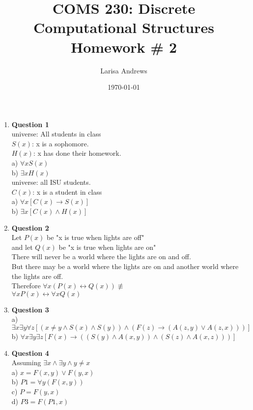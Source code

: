 \documentclass[12pt]{article}
\let\biconditional\leftrightarrow
\begin{document}

\title{
\textbf{COMS 230: Discrete Computational Structures}\\
Homework \# 2 \\}
\author{Larisa Andrews}
\date{\today}
\maketitle

\begin{enumerate}

\item {\bf Question 1} \\
	universe: All students in class \\
	$S(x)$: x is a sophomore. \\
	$H(x)$: x has done their homework. \\
	a) $\forall xS(x)$ \\
	b) $\exists xH(x)$ \\
	universe: all ISU students. \\ 
	$C(x)$: x is a student in class \\
	a) $\forall x[C(x) \rightarrow S(x)]$ \\
	b) $\exists x[C(x) \land H(x)]$ \\
	

\item {\bf Question 2} \\
Let $P(x)$ be "x is true when lights are off" \\
and let $Q(x)$ be "x is true when lights are on" \\
There will never be a world where the lights are on and off. \\
But there may be a world where the lights are on and another world where the lights are off. \\
Therefore $\forall x(P(x) \biconditional Q(x)) \not\equiv$ \\
$\forall xP(x) \biconditional  \forall xQ(x)$ 


\item {\bf Question 3} \\
a) $\exists x \exists y \forall z[(x \ne y \land S(x) \land S(y)) \land (F(z) \rightarrow (A(z,y) \lor A(z,x)))]$ \\
b) $\forall x \exists y \exists z[F(x) \rightarrow ((S(y) \land A(x,y)) \land (S(z) \land A(x,z)))]$\\


\item {\bf Question 4} \\
Assuming $\exists x \land \exists y \land y \ne x$ \\
a) $ x = F(x,y) \lor F(y,x) $ \\
b) $ P1 = \forall y(F(x,y)) $ \\
c) $ P = F(y,x)$ \\
d) $ P3 = F(P1, x)$\\


\end{enumerate}
\end{document}
